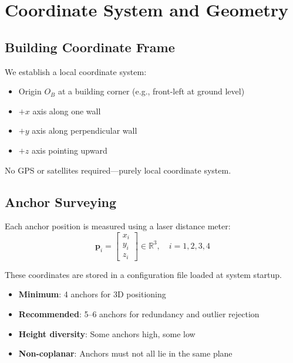 \documentclass[11pt,a4paper]{article}
\begin{document}
\section{Coordinate System and Geometry}

\subsection{Building Coordinate Frame}

We establish a local coordinate system:
\begin{itemize}
    \item Origin $O_B$ at a building corner (e.g., front-left at ground level)
    \item $+x$ axis along one wall
    \item $+y$ axis along perpendicular wall
    \item $+z$ axis pointing upward
\end{itemize}

No GPS or satellites required---purely local coordinate system.

\subsection{Anchor Surveying}

Each anchor position is measured using a laser distance meter:
\begin{equation}
    \mathbf{p}_i = \begin{bmatrix} x_i \\ y_i \\ z_i \end{bmatrix} \in \mathbb{R}^3, \quad i = 1, 2, 3, 4
\end{equation}

These coordinates are stored in a configuration file loaded at system startup.

\begin{warningbox}
\begin{itemize}
    \item \textbf{Minimum}: 4 anchors for 3D positioning
    \item \textbf{Recommended}: 5--6 anchors for redundancy and outlier rejection
    \item \textbf{Height diversity}: Some anchors high, some low
    \item \textbf{Non-coplanar}: Anchors must not all lie in the same plane
\end{itemize}
\end{warningbox}
\end{document}
